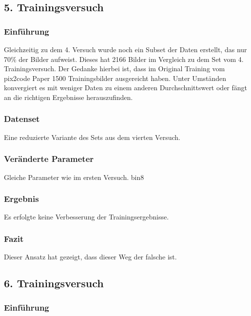 \documentclass[pdftex,a4paper,halfparskip, article]{scrartcl}
\begin{document}
\subsection{5. Trainingsversuch}

\subsubsection*{Einführung}

Gleichzeitig zu dem 4. Versuch wurde noch ein Subset der Daten erstellt, das nur 70\% der Bilder aufweist. Dieses hat 2166 Bilder im Vergleich zu dem Set vom 4. Trainingsversuch. Der Gedanke hierbei ist, dass im Original Training vom pix2code Paper 1500 Trainingsbilder ausgereicht haben. Unter Umständen konvergiert es mit weniger Daten zu einem anderen Durchschnittswert oder fängt an die richtigen Ergebnisse herauszufinden.

\subsubsection*{Datenset}
Eine reduzierte Variante des Sets aus dem vierten Versuch.

\subsubsection*{Veränderte Parameter}

Gleiche Parameter wie im ersten Versuch.
bin8

\subsubsection*{Ergebnis}

Es erfolgte keine Verbesserung der Trainingsergebnisse.

\subsubsection*{Fazit}

Dieser Ansatz hat gezeigt, dass dieser Weg der falsche ist.

\subsection{6. Trainingsversuch}

\subsubsection*{Einführung}
\end{document}
